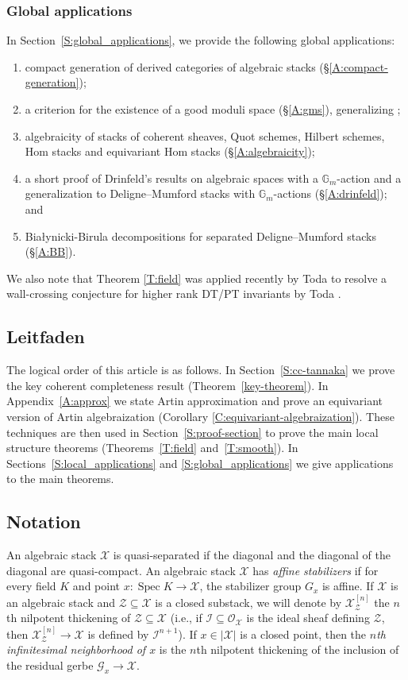 \documentclass[a4paper]{amsart}
\theoremstyle{plain}
\theoremstyle{definition}
\theoremstyle{remark}
\numberwithin{equation}{section}
\newcommand{\stX}{\mathcal{X}} %
\newcommand{\GG}{\mathbb{G}}
\newcommand\cG{\mathcal{G}}
\newcommand\cI{\mathcal{I}}
\newcommand\cX{\mathcal{X}}
\newcommand\cZ{\mathcal{Z}}
\newcommand\oh{\mathcal{O}}
\DeclareMathOperator{\Spec}{Spec}
\begin{document}
\subsubsection*{Global applications} In Section~\ref{S:global_applications}, we provide the following global applications:
\begin{enumerate}
\item compact generation of derived categories of algebraic stacks (\S\ref{A:compact-generation});
\item a criterion for the existence of a good moduli space (\S\ref{A:gms}), generalizing 
  \cite{keel-mori,afsw-good};
\item algebraicity of stacks of coherent sheaves, Quot schemes, Hilbert schemes, Hom stacks and equivariant Hom stacks (\S\ref{A:algebraicity});
  \item  a short proof of Drinfeld's results \cite{drinfeld} on algebraic spaces with a $\GG_m$-action and a generalization to Deligne--Mumford stacks with $\GG_m$-actions (\S\ref{A:drinfeld}); and
\item Bia\l ynicki-Birula decompositions for separated Deligne--Mumford stacks 
  (\S\ref{A:BB}). 
\end{enumerate}
We also note that Theorem \ref{T:field} was applied recently by Toda to resolve a wall-crossing conjecture for higher rank DT/PT invariants by Toda \cite{toda-hallalg}.

\subsection{Leitfaden} \label{S:leitfaden}
The logical order of this article is as follows. In Section~\ref{S:cc-tannaka} we
prove the key coherent completeness result (Theorem~\ref{key-theorem}). In Appendix~\ref{A:approx} we state Artin approximation and 
prove an equivariant version of Artin algebraization (Corollary \ref{C:equivariant-algebraization}). These techniques are
then used in Section~\ref{S:proof-section} to prove the main local structure theorems (Theorems~\ref{T:field}
and~\ref{T:smooth}). In Sections~\ref{S:local_applications} and \ref{S:global_applications} we give applications to the
main theorems.

\subsection{Notation} \label{S:notation} 
An algebraic stack $\cX$ is quasi-separated if the diagonal and the diagonal of the diagonal are quasi-compact.
An algebraic stack $\cX$ has \emph{affine stabilizers} if for every field $K$
and point $x\colon \Spec K\to \cX$, the stabilizer group $G_x$ is affine.
If $\cX$ is an algebraic stack and $\cZ \subseteq \cX$ is a closed substack, we will denote by $\cX_{\cZ}^{[n]}$  the $n$th nilpotent thickening of $\cZ \subseteq \cX$
(i.e., if $\cI \subseteq \oh_{\cX}$ is the ideal sheaf defining $\cZ$, then $\cX_{\cZ}^{[n]} \to \cX$ is defined by $\cI^{n+1}$).  If $x\in |\stX|$ is a closed
point, then the \emph{$n$th infinitesimal neighborhood of
  $x$} is the $n$th nilpotent thickening of the inclusion of the residual gerbe $\cG_x \to \cX$.
\end{document}

